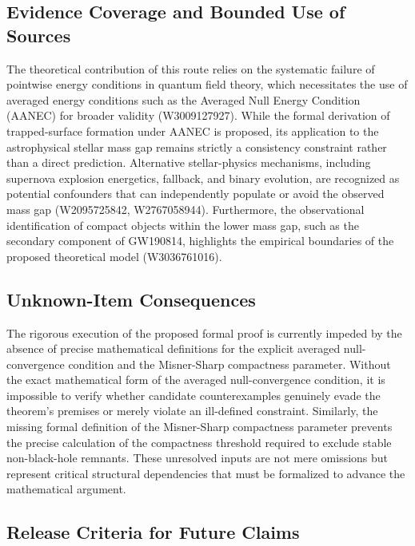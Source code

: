 \documentclass[conference]{IEEEtran}
\begin{document}
\subsection{Evidence Coverage and Bounded Use of Sources}
The theoretical contribution of this route relies on the systematic failure of pointwise energy conditions in quantum field theory, which necessitates the use of averaged energy conditions such as the Averaged Null Energy Condition (AANEC) for broader validity (W3009127927). While the formal derivation of trapped-surface formation under AANEC is proposed, its application to the astrophysical stellar mass gap remains strictly a consistency constraint rather than a direct prediction. Alternative stellar-physics mechanisms, including supernova explosion energetics, fallback, and binary evolution, are recognized as potential confounders that can independently populate or avoid the observed mass gap (W2095725842, W2767058944). Furthermore, the observational identification of compact objects within the lower mass gap, such as the secondary component of GW190814, highlights the empirical boundaries of the proposed theoretical model (W3036761016).~\cite{cite_0ed84243cf171bc4,cite_7a407c865faafd11}

\subsection{Unknown-Item Consequences}
The rigorous execution of the proposed formal proof is currently impeded by the absence of precise mathematical definitions for the explicit averaged null-convergence condition and the Misner-Sharp compactness parameter. Without the exact mathematical form of the averaged null-convergence condition, it is impossible to verify whether candidate counterexamples genuinely evade the theorem's premises or merely violate an ill-defined constraint. Similarly, the missing formal definition of the Misner-Sharp compactness parameter prevents the precise calculation of the compactness threshold required to exclude stable non-black-hole remnants. These unresolved inputs are not mere omissions but represent critical structural dependencies that must be formalized to advance the mathematical argument.

\subsection{Release Criteria for Future Claims}
\end{document}
